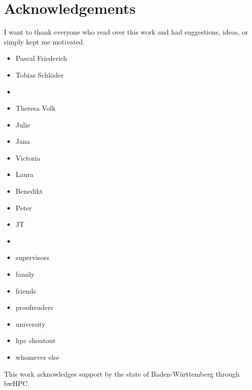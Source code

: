 \chapter{Acknowledgements}



I want to thank everyone who read over this work and had suggestions, ideas, or simply kept me motivated.
\begin{itemize}
    \item Pascal Friederich
    \item Tobias Schlöder
    \item 
    \item Theresa Volk
    \item Julie
    \item Jana
    \item Victoria
    \item Laura
    \item Benedikt
    \item Peter
    \item JT
    \item 

    \item supervisors
    \item family
    \item friends
    \item proofreaders
    \item university
    \item hpc shoutout
    \item whomever else
\end{itemize}


This work acknowledges support by the state of Baden-Württemberg through bwHPC.
